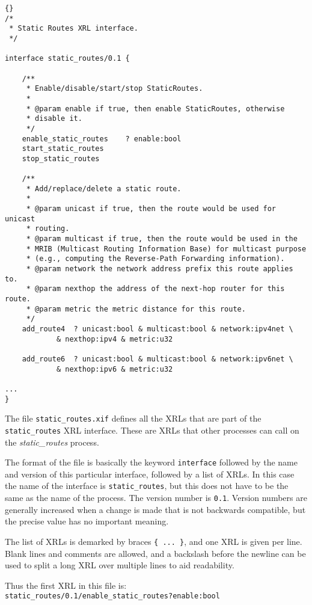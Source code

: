 \documentclass[11pt]{article}
\newcommand{\stt}{\tt\small}
\begin{document}
\begin{lstlisting}[caption={ The start of {\tt\small static\_routes.xif} %
                                     \label{lst:xif} } ]{}
/*
 * Static Routes XRL interface.
 */

interface static_routes/0.1 {

	/**
	 * Enable/disable/start/stop StaticRoutes.
	 *
	 * @param enable if true, then enable StaticRoutes, otherwise
	 * disable it.
	 */
	enable_static_routes	? enable:bool
	start_static_routes
	stop_static_routes

	/**
	 * Add/replace/delete a static route.
	 *
	 * @param unicast if true, then the route would be used for unicast
	 * routing.
	 * @param multicast if true, then the route would be used in the
	 * MRIB (Multicast Routing Information Base) for multicast purpose
	 * (e.g., computing the Reverse-Path Forwarding information).
	 * @param network the network address prefix this route applies to.
	 * @param nexthop the address of the next-hop router for this route.
	 * @param metric the metric distance for this route.
	 */
	add_route4	? unicast:bool & multicast:bool & network:ipv4net \
			& nexthop:ipv4 & metric:u32

	add_route6	? unicast:bool & multicast:bool & network:ipv6net \
			& nexthop:ipv6 & metric:u32

...
}
\end{lstlisting}

The file {\stt static\_routes.xif} defines all the XRLs that are part of the
{\stt static\_routes} XRL interface.  These are XRLs that other processes can
call on the {\it static\_routes} process.

The format of the file is basically the keyword {\stt interface}
followed by the name and version of this particular interface,
followed by a list of XRLs.  
In this case the name of the interface is {\stt static\_routes}, but
this does not have to be the same as the name of the process.  The
version number is {\stt 0.1}.  Version numbers are generally increased
when a change is made that is not backwards compatible, but the
precise value has no important meaning.

The list of XRLs is demarked by braces {\stt \{ ... \}}, and one XRL is
given per line.  Blank lines and comments are allowed, and a backslash
before the newline can be used to split a long XRL over multiple lines
to aid readability.

\vspace{0.1in}
\noindent
Thus the first XRL in this file is:\\
 {\tt\small static\_routes/0.1/enable\_static\_routes?enable:bool}
\end{document}

